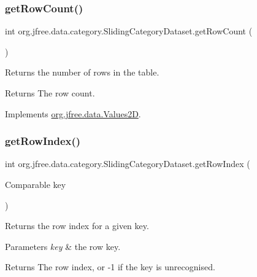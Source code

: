 \subsubsection{\texorpdfstring{get\+Row\+Count()}{getRowCount()}}
{\footnotesize\ttfamily int org.\+jfree.\+data.\+category.\+Sliding\+Category\+Dataset.\+get\+Row\+Count (\begin{DoxyParamCaption}{ }\end{DoxyParamCaption})}

Returns the number of rows in the table.

\begin{DoxyReturn}{Returns}
The row count. 
\end{DoxyReturn}


Implements \mbox{\hyperlink{interfaceorg_1_1jfree_1_1data_1_1_values2_d_a9ce939b45128515a9841a7d018a6ad0e}{org.\+jfree.\+data.\+Values2D}}.

\mbox{\label{classorg_1_1jfree_1_1data_1_1category_1_1_sliding_category_dataset_ad364c75ca5d7a8bae6f3eaa2e0807310}} 
\subsubsection{\texorpdfstring{get\+Row\+Index()}{getRowIndex()}}
{\footnotesize\ttfamily int org.\+jfree.\+data.\+category.\+Sliding\+Category\+Dataset.\+get\+Row\+Index (\begin{DoxyParamCaption}\item[{Comparable}]{key }\end{DoxyParamCaption})}

Returns the row index for a given key.


\begin{DoxyParams}{Parameters}
{\em key} & the row key.\\
\hline
\end{DoxyParams}
\begin{DoxyReturn}{Returns}
The row index, or {\ttfamily -\/1} if the key is unrecognised. 
\end{DoxyReturn}


